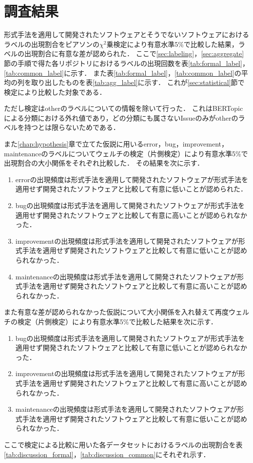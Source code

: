 \documentclass[main]{subfiles}
\begin{document}
\chapter{調査結果}

形式手法を適用して開発されたソフトウェアとそうでないソフトウェアにおけるラベルの出現割合をピアソンの\(\chi^2\)乗検定により有意水準5\%で比較した結果，ラベルの出現割合に有意な差が認められた．
ここで\ref{sec:labeling}，\ref{sec:aggregate}節の手順で得た各リポジトリにおけるラベルの出現回数を表\ref{tab:formal_label}，\ref{tab:common_label}に示す．
また表\ref{tab:formal_label}，\ref{tab:common_label}の平均の列を取り出したものを表\ref{tab:agg_label}に示す．
これが\ref{sec:statistical}節で検定により比較した対象である．

ただし検定はotherのラベルについての情報を除いて行った．
これはBERTopicによる分類における外れ値であり，どの分類にも属さないIssueのみがotherのラベルを持つとは限らないためである．



また\ref{chap:hypothesis}章で立てた仮説に用いるerror，bug，improvement，maintenanceのラベルについてウェルチの検定（片側検定）により有意水準5\%で出現割合の大小関係をそれぞれ比較した．
その結果を次に示す．

\begin{enumerate}
	\item errorの出現頻度は形式手法を適用して開発されたソフトウェアが形式手法を適用せず開発されたソフトウェアと比較して有意に低いことが認められた．
	\item bugの出現頻度は形式手法を適用して開発されたソフトウェアが形式手法を適用せず開発されたソフトウェアと比較して有意に高いことが認められなかった．
	\item improvementの出現頻度は形式手法を適用して開発されたソフトウェアが形式手法を適用せず開発されたソフトウェアと比較して有意に低いことが認められなかった．
	\item maintenanceの出現頻度は形式手法を適用して開発されたソフトウェアが形式手法を適用せず開発されたソフトウェアと比較して有意に高いことが認められなかった．
\end{enumerate}

また有意な差が認められなかった仮説について大小関係を入れ替えて再度ウェルチの検定（片側検定）により有意水準5\%で比較した結果を次に示す．

\begin{enumerate}
	\item bugの出現頻度は形式手法を適用して開発されたソフトウェアが形式手法を適用せず開発されたソフトウェアと比較して有意に低いことが認められなかった．
	\item improvementの出現頻度は形式手法を適用して開発されたソフトウェアが形式手法を適用せず開発されたソフトウェアと比較して有意に高いことが認められなかった．
	\item maintenanceの出現頻度は形式手法を適用して開発されたソフトウェアが形式手法を適用せず開発されたソフトウェアと比較して有意に低いことが認められなかった．
\end{enumerate}

ここで検定による比較に用いた各データセットにおけるラベルの出現割合を表\ref{tab:discussion_formal}，\ref{tab:discussion_common}にそれぞれ示す．


\end{document}
